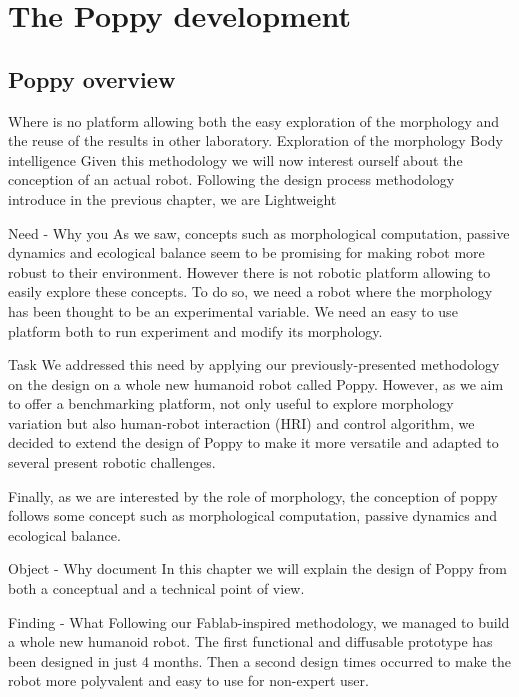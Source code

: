 



\chapter{The Poppy development} %

\section{Poppy overview} %

Where is no platform allowing both the easy exploration of the morphology and the reuse of the results in other laboratory.
Exploration of the morphology
Body intelligence
Given this methodology we will now interest ourself about the conception of an actual robot.
Following the design process methodology introduce in the previous chapter, we are
Lightweight


Need - Why you
As we saw, concepts such as morphological computation, passive dynamics and ecological balance seem to be promising for making robot more robust to their environment. However there is not robotic platform allowing to easily explore these concepts. To do so, we need a robot where the morphology has been thought to be an experimental variable.
We need an easy to use platform both to run experiment and modify its morphology.


Task
We addressed this need by applying our previously-presented methodology on the design on a whole new humanoid robot called Poppy.
However, as we aim to offer a benchmarking platform, not only useful to explore morphology variation but also human-robot interaction (HRI) and control algorithm, we decided to extend the design of Poppy to make it more versatile and adapted to several present robotic challenges.

Finally, as we are interested by the role of morphology, the conception of poppy follows some concept such as morphological computation, passive dynamics and ecological balance.

Object - Why document
In this chapter we will explain the design of Poppy from both a conceptual and a technical point of view.

Finding - What
Following our Fablab-inspired methodology, we managed to build a whole new humanoid robot. The first functional and diffusable prototype has been designed in just 4 months. Then a second design times occurred to make the robot more polyvalent and easy to use for non-expert user.

